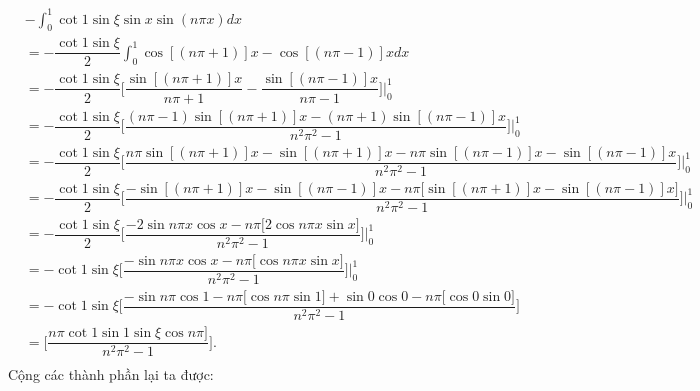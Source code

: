 \documentclass{article}
\newcommand{\f}[2]{\dfrac{#1}{#2}}
\newcommand{\at}[2]{\bigg\rvert_{#1}^{#2} }
\begin{document}
\begin{align*}
	 & -\int_{0}^{1} \cot 1 \sin \xi \sin x \sin (n\pi x) dx                                                                                                                           \\
	 & = -\f{\cot 1 \sin \xi}{2} \int_{0}^{1} \cos [(n\pi + 1)]x - \cos [(n\pi - 1)]x dx                                                                                               \\
	 & = -\f{\cot 1 \sin \xi}{2} \biggl[ \f{\sin [(n\pi + 1)]x}{n\pi + 1} - \f{\sin [(n\pi - 1)]x}{n\pi - 1} \biggr] \at{0}{1}                                                         \\
	 & = -\f{\cot 1 \sin \xi}{2} \biggl[ \f{(n\pi - 1)\sin [(n\pi + 1)]x - (n\pi + 1) \sin [(n\pi - 1)]x}{n^2\pi^2 - 1} \biggr] \at{0}{1}                                              \\
	 & = -\f{\cot 1 \sin \xi}{2} \biggl[ \f{ n\pi\sin [(n\pi + 1)]x - \sin [(n\pi + 1)]x - n\pi \sin [(n\pi - 1)]x  - \sin [(n\pi - 1)]x}{n^2\pi^2 - 1} \biggr] \at{0}{1}              \\
	 & = -\f{\cot 1 \sin \xi}{2} \biggl[ \f{ - \sin [(n\pi + 1)]x - \sin [(n\pi - 1)]x - n\pi \bigl[ \sin [(n\pi + 1)]x - \sin [(n\pi - 1)]x \bigr]  }{n^2\pi^2 - 1} \biggr] \at{0}{1} \\
	 & = -\f{\cot 1 \sin \xi}{2} \biggl[ \f{ - 2\sin n\pi x \cos x - n\pi \bigl[ 2\cos n\pi x \sin x \bigr]  }{n^2\pi^2 - 1} \biggr] \at{0}{1}                                         \\
	 & = -{\cot 1 \sin \xi} \biggl[ \f{ - \sin n\pi x \cos x - n\pi \bigl[ \cos n\pi x \sin x \bigr]  }{n^2\pi^2 - 1} \biggr] \at{0}{1}                                                \\
	 & = -{\cot 1 \sin \xi} \biggl[ \f{ - \sin n\pi \cos 1 - n\pi \bigl[ \cos n\pi \sin 1  \bigr] + \sin 0 \cos 0 - n\pi \bigl[ \cos 0 \sin 0  \bigr]}{n^2\pi^2 - 1} \biggr]           \\
	 & = \biggl[\f{ n\pi\cot 1 \sin 1 \sin \xi  \cos n\pi \bigr]}{n^2\pi^2 - 1} \biggr].                                                                                               \\
\end{align*}
Cộng các thành phần lại ta được:
\end{document}
